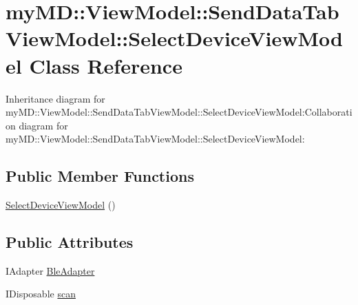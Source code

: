 \hypertarget{classmy_m_d_1_1_view_model_1_1_send_data_tab_view_model_1_1_select_device_view_model}{
\section{my\-MD::View\-Model::Send\-Data\-Tab\-View\-Model::Select\-Device\-View\-Model Class Reference}
\label{d9/d00/classmy_m_d_1_1_view_model_1_1_send_data_tab_view_model_1_1_select_device_view_model}
}
Inheritance diagram for my\-MD::View\-Model::Send\-Data\-Tab\-View\-Model::Select\-Device\-View\-Model:Collaboration diagram for my\-MD::View\-Model::Send\-Data\-Tab\-View\-Model::Select\-Device\-View\-Model:\subsection*{Public Member Functions}
\begin{CompactItemize}
\item 
\hypertarget{classmy_m_d_1_1_view_model_1_1_send_data_tab_view_model_1_1_select_device_view_model_65eb0e05ea73bb5d217bdd387d8c328a}{
\hyperlink{classmy_m_d_1_1_view_model_1_1_send_data_tab_view_model_1_1_select_device_view_model_65eb0e05ea73bb5d217bdd387d8c328a}{Select\-Device\-View\-Model} ()}
\label{d9/d00/classmy_m_d_1_1_view_model_1_1_send_data_tab_view_model_1_1_select_device_view_model_65eb0e05ea73bb5d217bdd387d8c328a}

\end{CompactItemize}
\subsection*{Public Attributes}
\begin{CompactItemize}
\item 
\hypertarget{classmy_m_d_1_1_view_model_1_1_send_data_tab_view_model_1_1_select_device_view_model_f2c52ca5f61e896a4bf2ff6175056c01}{
IAdapter \hyperlink{classmy_m_d_1_1_view_model_1_1_send_data_tab_view_model_1_1_select_device_view_model_f2c52ca5f61e896a4bf2ff6175056c01}{Ble\-Adapter}}
\label{d9/d00/classmy_m_d_1_1_view_model_1_1_send_data_tab_view_model_1_1_select_device_view_model_f2c52ca5f61e896a4bf2ff6175056c01}

\item 
\hypertarget{classmy_m_d_1_1_view_model_1_1_send_data_tab_view_model_1_1_select_device_view_model_53aefec08170b2ebed981a0a86d0dbe0}{
IDisposable \hyperlink{classmy_m_d_1_1_view_model_1_1_send_data_tab_view_model_1_1_select_device_view_model_53aefec08170b2ebed981a0a86d0dbe0}{scan}}
\label{d9/d00/classmy_m_d_1_1_view_model_1_1_send_data_tab_view_model_1_1_select_device_view_model_53aefec08170b2ebed981a0a86d0dbe0}

\end{CompactItemize}
